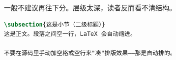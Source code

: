 一般不建议再往下分。层级太深，读者反而看不清结构。


\begin{lstlisting}[language=TeX]
\subsection{这是小节（二级标题）}
这是正文。段落之间空一行，LaTeX 会自动缩进。

不要在源码里手动加空格或空行来"凑"排版效果——那是自动排的。
\end{lstlisting}
